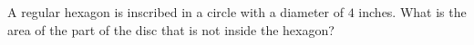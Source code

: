 A regular hexagon is inscribed in a circle with a diameter of $4$ inches. What is the area of the part of the disc that is not inside the hexagon?
